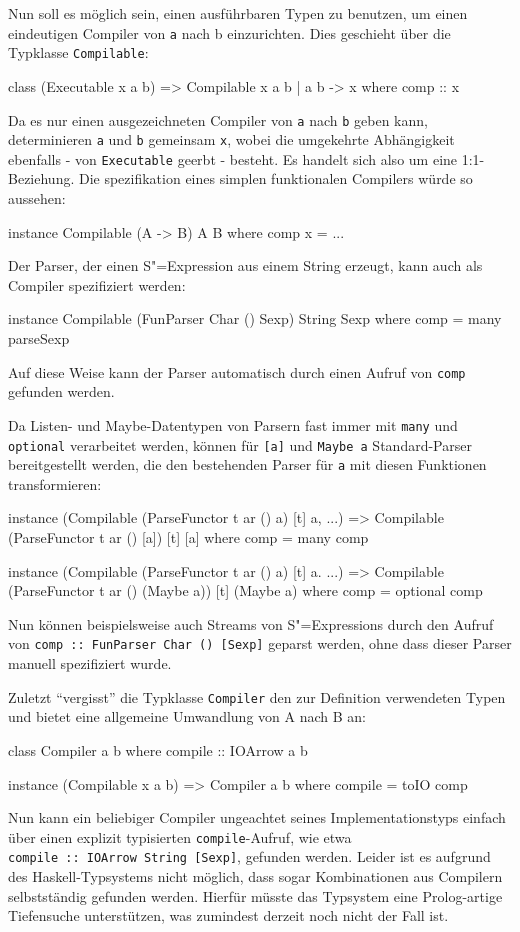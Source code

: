 \documentclass[11pt, a4paper, bibgerm]{scrbook}
\newcommand\icode[1]{\lstinline?#1?}
\newcommand{\sexp}{S"=Expression}
\newcommand{\sexps}{S"=Expressions}
\begin{document}
Nun soll es möglich sein, einen ausführbaren Typen zu benutzen, um einen
eindeutigen Compiler von \icode{a} nach {b} einzurichten. Dies geschieht
über die Typklasse \icode{Compilable}:
\begin{code}
class (Executable x a b) => Compilable x a b | a b -> x where
  comp :: x
\end{code}
Da es nur einen ausgezeichneten Compiler von \icode{a} nach \icode{b}
geben kann, determinieren \icode{a} und \icode{b} gemeinsam \icode{x},
wobei die umgekehrte Abhängigkeit ebenfalls - von \icode{Executable}
geerbt - besteht. Es handelt sich also um eine 1:1-Beziehung. Die
spezifikation eines simplen funktionalen Compilers würde so aussehen:
\begin{code}
instance Compilable (A -> B) A B where
  comp x = ...
\end{code}
Der Parser, der einen \sexp{} aus einem String erzeugt, kann auch als
Compiler spezifiziert werden:
\begin{code}
instance Compilable (FunParser Char () Sexp) String Sexp where
  comp = many parseSexp
\end{code}
Auf diese Weise kann der Parser automatisch durch einen Aufruf von
\icode{comp} gefunden werden.

Da Listen- und Maybe-Datentypen von Parsern fast immer mit \icode{many}
und \icode{optional} verarbeitet werden, können für \icode{[a]} und
\icode{Maybe a} Standard-Parser bereitgestellt werden, die den
bestehenden Parser für \icode{a} mit diesen Funktionen transformieren:
\begin{code}
instance (Compilable (ParseFunctor t ar () a) [t] a, ...) =>
  Compilable (ParseFunctor t ar () [a]) [t] [a] where
    comp = many comp

instance (Compilable (ParseFunctor t ar () a) [t] a. ...) =>
  Compilable (ParseFunctor t ar () (Maybe a)) [t] (Maybe a) where
    comp = optional comp
\end{code}
Nun können beispielsweise auch Streams von \sexps{} durch den Aufruf von
\icode{comp :: FunParser Char () [Sexp]} geparst werden, ohne dass dieser
  Parser manuell spezifiziert wurde.

Zuletzt "`vergisst"' die Typklasse \icode{Compiler} den zur Definition
verwendeten Typen und bietet eine allgemeine Umwandlung von A nach B an:
\begin{code}
class Compiler a b where
  compile :: IOArrow a b

instance (Compilable x a b) => Compiler a b where
  compile = toIO comp
\end{code}
Nun kann ein beliebiger Compiler ungeachtet seines Implementationstyps
einfach über einen explizit typisierten \icode{compile}-Aufruf, wie etwa
\\\icode{compile :: IOArrow String [Sexp]}, gefunden werden. Leider ist
es aufgrund des Haskell-Typsystems nicht möglich, dass sogar
Kombinationen aus Compilern selbstständig gefunden werden. Hierfür
müsste das Typsystem eine Prolog-artige Tiefensuche unterstützen, was
zumindest derzeit noch nicht der Fall ist. 
\end{document}
